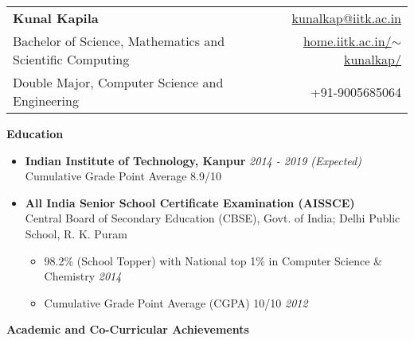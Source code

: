 \documentclass[letterpaper,11pt]{article}
\begin{document}
{\selectfont
\begin{tabular*}{7.5in}{l@{\extracolsep{\fill}}r}
    \textbf{\Large Kunal Kapila} & \href{mailto:kunalkap@iitk.ac.in}{kunalkap@iitk.ac.in}\\
    Bachelor of Science, Mathematics and Scientific Computing & \href{http://home.iitk.ac.in/~kunalkap/}{home.iitk.ac.in/$\sim$kunalkap/}\\
    Double Major, Computer Science and Engineering & +91-9005685064\\
    \hline
\end{tabular*}
\vspace{5pt}

\Large{\textbf{Education}}
\small
\begin{itemize}
    \item
        \textbf{Indian Institute of Technology, Kanpur} \hfill \textit{2014 - 2019 (Expected)}\\
        Cumulative Grade Point Average 8.9/10\\
    \item
        \textbf{All India Senior School Certificate Examination (AISSCE)}\\
        Central Board of Secondary Education (CBSE), Govt. of India; Delhi Public School, R. K. Puram\\
        \begin{itemize}
            \item 98.2\% (School Topper) with National top 1\% in Computer Science \& Chemistry \hfill \textit{2014}\\
            \item Cumulative Grade Point Average (CGPA) 10/10 \hfill\textit{2012}\\
        \end{itemize}
\end{itemize}

\Large{\textbf{Academic and Co-Curricular Achievements}}
\small

}
\end{document}
